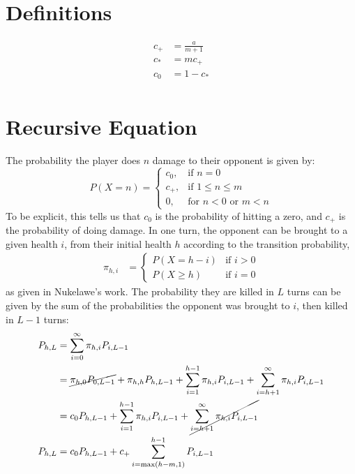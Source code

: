 \section{Definitions}
\begin{align}
c_+ &= \frac{a}{m+1} \\
c_* &= mc_+ \\
c_0 &= 1 - c_* \\
\end{align}

\section{Recursive Equation}
The probability the player does $n$ damage to their opponent is given by:
\begin{equation}\label{eq:probability_of_n_damage}
	P(X=n) = \begin{cases}
    c_0, & \text{if } n=0\\
    c_+, & \text{if } 1 \leq n \leq m\\
    0, & \text{for } n < 0 \text{ or } m < n
    \end{cases}
\end{equation}
To be explicit, this tells us that $c_0$ is the probability of hitting a zero, and $c_+$ is the probability of doing damage. In one turn, the opponent can be brought to a given health $i$, from their initial health $h$ according to the transition probability, 
\begin{align}
	\pi_{h, i} &= \begin{cases}
		P(X=h - i) & \text{if } i > 0 \\
		P(X\ge h) & \text{if } i = 0
    \end{cases}
\end{align}
as given in Nukelawe's work. The probability they are killed in $L$ turns can be given by the sum of the probabilities the opponent was brought to $i$, then killed in $L - 1$ turns:
\begin{align}
	P_{h, L} &= \sum_{i=0}^\infty \pi_{h, i} P_{i, L-1}\\
	&= \cancel{\pi_{h, 0} P_{0, L-1}} + \pi_{h, h} P_{h, L-1} + \sum_{i=1}^{h-1} \pi_{h, i} P_{i, L-1} + \sum_{i=h+1}^\infty \pi_{h, i} P_{i, L-1}\\
	&= c_0P_{h, L-1} + \sum_{i=1}^{h-1} \pi_{h, i} P_{i, L-1} + \cancel{\sum_{i=h+1}^\infty \pi_{h, i} P_{i, L-1}}\\
	P_{h, L} &= c_0P_{h, L-1} + c_+\sum_{i=\max(h-m, 1)}^{h-1} P_{i, L-1}\\
\end{align}
